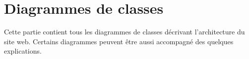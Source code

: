 \chapter{Diagrammes de classes}

Cette partie contient tous les diagrammes de classes décrivant l'architecture du site web. Certains diagrammes peuvent être aussi accompagné des quelques explications.
